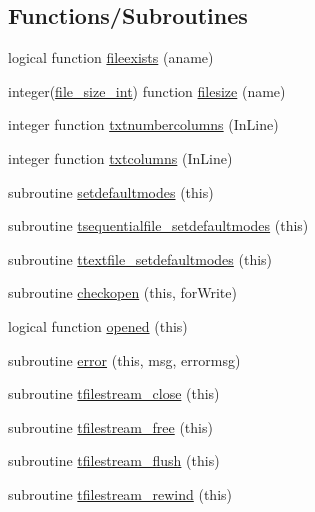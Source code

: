 \subsection*{Functions/\+Subroutines}
\begin{DoxyCompactItemize}
\item 
logical function \mbox{\hyperlink{namespacefileutils_a7eed5e57dbe4803901c5cb2d33f32e66}{fileexists}} (aname)
\item 
integer(\mbox{\hyperlink{namespacefileutils_a334ae57c14956bd4597df7a130f6e8a8}{file\+\_\+size\+\_\+int}}) function \mbox{\hyperlink{namespacefileutils_a7e3025ea32fc9f426d78cd5dab68e470}{filesize}} (name)
\item 
integer function \mbox{\hyperlink{namespacefileutils_a16fc3d0615e1fa05eed9d70c7f6c8861}{txtnumbercolumns}} (In\+Line)
\item 
integer function \mbox{\hyperlink{namespacefileutils_a704f148cd0ca7af88eec65d167460683}{txtcolumns}} (In\+Line)
\item 
subroutine \mbox{\hyperlink{namespacefileutils_ab29c958b3ef2154cee501206eeeab071}{setdefaultmodes}} (this)
\item 
subroutine \mbox{\hyperlink{namespacefileutils_aae5dfea33ac7521267fc2bd055c532e7}{tsequentialfile\+\_\+setdefaultmodes}} (this)
\item 
subroutine \mbox{\hyperlink{namespacefileutils_a40d911d4c6f3119ad169ba092b5d8131}{ttextfile\+\_\+setdefaultmodes}} (this)
\item 
subroutine \mbox{\hyperlink{namespacefileutils_af19fea352f8dfa2014baece1a62940f4}{checkopen}} (this, for\+Write)
\item 
logical function \mbox{\hyperlink{namespacefileutils_ab874a71428e21012e34c256de9cf461d}{opened}} (this)
\item 
subroutine \mbox{\hyperlink{namespacefileutils_ad8e0926f0aaad2fd9464ad5e4bc01db0}{error}} (this, msg, errormsg)
\item 
subroutine \mbox{\hyperlink{namespacefileutils_a92f8878926ad7488d2cdaf82a8d09d6a}{tfilestream\+\_\+close}} (this)
\item 
subroutine \mbox{\hyperlink{namespacefileutils_a5c9784aa40b01ea30ef204e7aeb9db9e}{tfilestream\+\_\+free}} (this)
\item 
subroutine \mbox{\hyperlink{namespacefileutils_aed117908fc58fe14559073780dce043b}{tfilestream\+\_\+flush}} (this)
\item 
subroutine \mbox{\hyperlink{namespacefileutils_a0c1819d96b0ed98d4ae2ebd441d5810f}{tfilestream\+\_\+rewind}} (this)

\end{DoxyCompactItemize}
